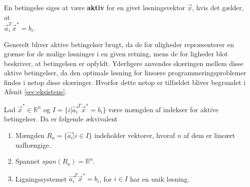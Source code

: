 \begin{defn}
En betingelse siges at være \textbf{aktiv} for en givet løsningsvektor $\vec{x}$, hvis det gælder, at\\ $\vec{a}_i^T \vec{x}^* = b_i$.
\label{def:aktiv}
\end{defn}

Generelt bliver aktive betingelser brugt, da de for uligheder repræsenterer en grænse for de mulige løsninger i en given retning, mens de for ligheder blot beskriver, at betingelsen er opfyldt.
Yderligere anvendes skæringen mellem disse aktive betingelser, da den optimale løsning for lineære programmeringsproblemer findes i netop disse skæringer. Hvorfor dette netop er tilfældet bliver begrundet i Afsnit \ref{sec:eksistens}.

\begin{stn}
Lad $\vec{x}^* \in \mathds{R}^n$ og $I = \{i | \vec{a_i}^T \vec{x}^* = b_i\}$ være mængden af indekser for aktive betingelser. Da er følgende ækvivalent
\begin{enumerate}[label=(\alph*)]
\item Mængden $R_a =\{\vec{a_i}| i\in I\}$ indeholder vektorer, hvoraf $n$ af dem er lineært uafhængige.
\item Spannet $span(R_a) = \mathds{R}^n$.
\item Ligningssystemet $\vec{a_i}^T \vec{x}^* = b_i$, for $i \in I$ har en unik løsning.
\end{enumerate}
\label{stn:uniklosning}
\end{stn} %

